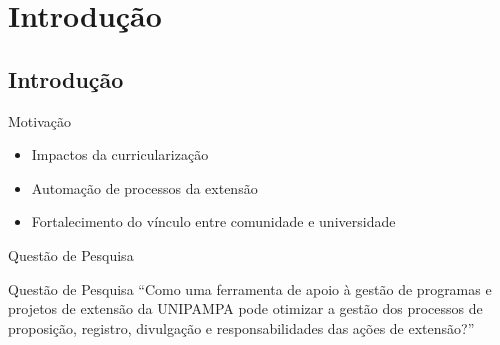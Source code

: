 
\section{Introdução}
\subsection*{Introdução}


\begin{frame}{{\sffamily Motivação}}
  \begin{block}{}
    \begin{itemize}%
      \item Impactos da curricularização %
      \item Automação de processos da extensão %
      \item Fortalecimento do vínculo entre comunidade e universidade %
    \end{itemize}
  \end{block}
\end{frame}

\begin{frame}{{\sffamily Questão de Pesquisa}}
  \begin{block}{Questão de Pesquisa}
    ``Como uma ferramenta de apoio à gestão de programas e projetos de extensão da UNIPAMPA pode otimizar a gestão dos processos de proposição, registro, divulgação e responsabilidades das ações de extensão?''
  \end{block}
\end{frame}

